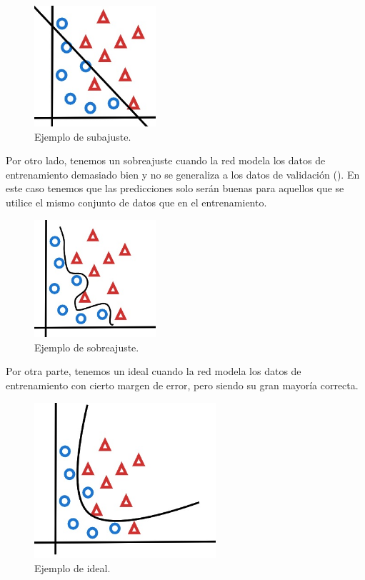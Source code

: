 \begin{figure}[H]
    \centering
    \includegraphics[width=0.4\textwidth]{MarcoTeorico/imgs/Ajuste_subajuste.jpg}
    \caption{Ejemplo de subajuste.}
    \label{fig:OverFiting}
\end{figure}


Por otro lado, tenemos un sobreajuste cuando la red modela los datos de entrenamiento demasiado bien y no se generaliza a los datos de validación (\cite{rosebrock2017deep}). En este caso tenemos que las predicciones solo serán buenas para aquellos que se utilice el mismo conjunto de datos que en el entrenamiento.

\begin{figure}[H]
    \centering
    \includegraphics[width=0.4\textwidth]{MarcoTeorico/imgs/Ajuste_sobreajuste.jpg}
    \caption{Ejemplo de sobreajuste.}
    \label{fig:underFiting}
\end{figure}

Por otra parte, tenemos un ideal cuando la red modela los datos de entrenamiento con cierto margen de error, pero siendo su gran mayoría correcta.

\begin{figure}[H]
    \centering
    \includegraphics[width=0.6\textwidth]{MarcoTeorico/imgs/Ajuste_ideal.jpg}
    \caption{Ejemplo de ideal.}
    \label{fig:idealFiting}
\end{figure}


